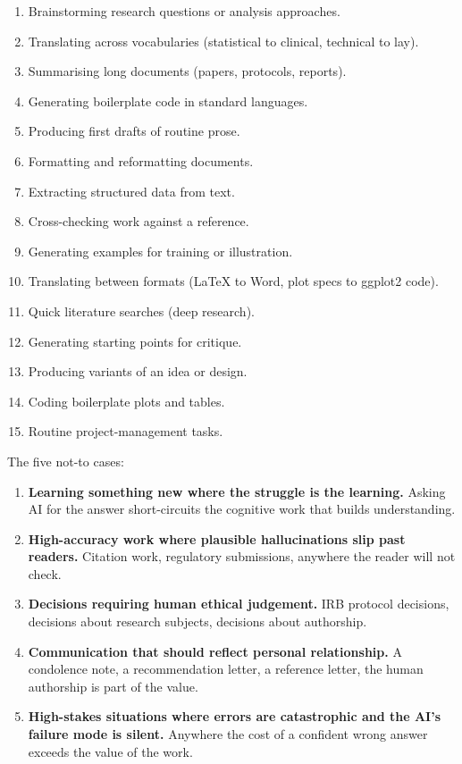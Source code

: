 \documentclass[
  letterpaper,
  11pt]{scrbook}
\providecommand{\tightlist}{%
  \setlength{\itemsep}{0pt}\setlength{\parskip}{0pt}}
\begin{document}
\begin{enumerate}
\def\labelenumi{\arabic{enumi}.}
\tightlist
\item
  Brainstorming research questions or analysis approaches.
\item
  Translating across vocabularies (statistical to clinical, technical to
  lay).
\item
  Summarising long documents (papers, protocols, reports).
\item
  Generating boilerplate code in standard languages.
\item
  Producing first drafts of routine prose.
\item
  Formatting and reformatting documents.
\item
  Extracting structured data from text.
\item
  Cross-checking work against a reference.
\item
  Generating examples for training or illustration.
\item
  Translating between formats (LaTeX to Word, plot specs to ggplot2
  code).
\item
  Quick literature searches (deep research).
\item
  Generating starting points for critique.
\item
  Producing variants of an idea or design.
\item
  Coding boilerplate plots and tables.
\item
  Routine project-management tasks.
\end{enumerate}

The five not-to cases:

\begin{enumerate}
\def\labelenumi{\arabic{enumi}.}
\tightlist
\item
  \textbf{Learning something new where the struggle is the learning.}
  Asking AI for the answer short-circuits the cognitive work that builds
  understanding.
\item
  \textbf{High-accuracy work where plausible hallucinations slip past
  readers.} Citation work, regulatory submissions, anywhere the reader
  will not check.
\item
  \textbf{Decisions requiring human ethical judgement.} IRB protocol
  decisions, decisions about research subjects, decisions about
  authorship.
\item
  \textbf{Communication that should reflect personal relationship.} A
  condolence note, a recommendation letter, a reference letter, the
  human authorship is part of the value.
\item
  \textbf{High-stakes situations where errors are catastrophic and the
  AI's failure mode is silent.} Anywhere the cost of a confident wrong
  answer exceeds the value of the work.
\end{enumerate}
\end{document}
